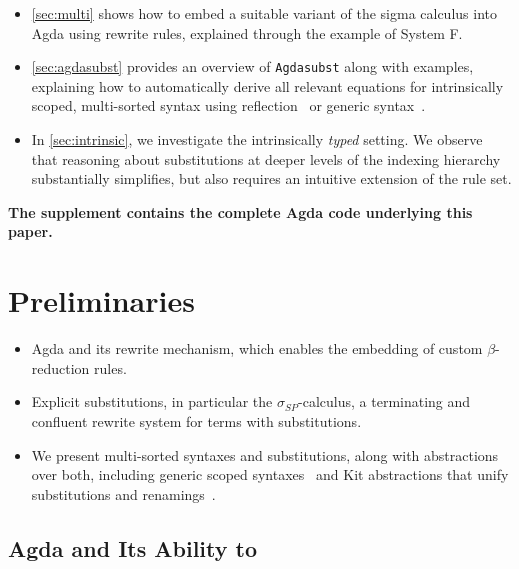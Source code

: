 \documentclass[screen,nonacm]{acmart}
\begin{document}
\begin{itemize}
  \item \cref{sec:multi} shows how to embed a suitable variant of the
        sigma calculus into Agda using rewrite rules, explained through the example of System F.

  \item \cref{sec:agdasubst} provides an overview of \texttt{Agdasubst} along with examples, 
        explaining how to automatically derive all relevant equations for intrinsically scoped, 
        multi-sorted syntax using reflection~\cite{saffrich:LIPIcs.ITP.2024.32} 
        or generic syntax~\cite{allais2021typescopesafeuniverse}.

  \item In \cref{sec:intrinsic}, we investigate the intrinsically \emph{typed} setting.
        We observe that reasoning about substitutions at deeper levels of the indexing
        hierarchy substantially simplifies, but also requires an intuitive extension of
        the rule set.
\end{itemize}

\textbf{The supplement contains the complete Agda code underlying this paper.}

\section{Preliminaries}\label{sec:preliminaries}

\begin{itemize}
  \item Agda and its rewrite mechanism, which enables the embedding of custom
        $\beta$-reduction rules.
  \item Explicit substitutions, in particular the $\sigma_{SP}$-calculus, a terminating
        and confluent rewrite system for terms with substitutions.
  \item We present multi-sorted syntaxes and substitutions, along with abstractions over both, 
        including generic scoped syntaxes~\cite{allais2021typescopesafeuniverse} and 
        Kit abstractions that unify substitutions and renamings~\cite{stronglytyped,ren-sub}.


\end{itemize}

\subsection{Agda and Its Ability to }
\end{document}

